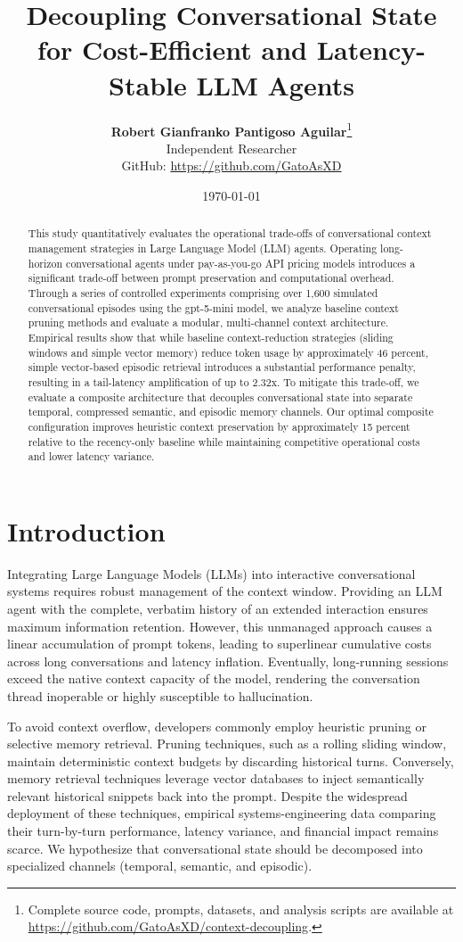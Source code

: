 \documentclass[11pt,journal,onecolumn]{article}
\title{\textbf{Decoupling Conversational State for Cost-Efficient and Latency-Stable LLM Agents}}
\author{\textbf{Robert Gianfranko Pantigoso Aguilar}\thanks{Complete source code, prompts, datasets, and analysis scripts are available at \url{https://github.com/GatoAsXD/context-decoupling}.} \\
Independent Researcher \\
GitHub: \url{https://github.com/GatoAsXD}}
\date{\today}
\begin{document}
\maketitle

\begin{abstract}
This study quantitatively evaluates the operational trade-offs of conversational context management strategies in Large Language Model (LLM) agents. Operating long-horizon conversational agents under pay-as-you-go API pricing models introduces a significant trade-off between prompt preservation and computational overhead. Through a series of controlled experiments comprising over 1,600 simulated conversational episodes using the gpt-5-mini model, we analyze baseline context pruning methods and evaluate a modular, multi-channel context architecture. Empirical results show that while baseline context-reduction strategies (sliding windows and simple vector memory) reduce token usage by approximately 46 percent, simple vector-based episodic retrieval introduces a substantial performance penalty, resulting in a tail-latency amplification of up to 2.32x. To mitigate this trade-off, we evaluate a composite architecture that decouples conversational state into separate temporal, compressed semantic, and episodic memory channels. Our optimal composite configuration improves heuristic context preservation by approximately 15 percent relative to the recency-only baseline while maintaining competitive operational costs and lower latency variance.
\end{abstract}

\section{Introduction}
Integrating Large Language Models (LLMs) into interactive conversational systems requires robust management of the context window. Providing an LLM agent with the complete, verbatim history of an extended interaction ensures maximum information retention. However, this unmanaged approach causes a linear accumulation of prompt tokens, leading to superlinear cumulative costs across long conversations and latency inflation. Eventually, long-running sessions exceed the native context capacity of the model, rendering the conversation thread inoperable or highly susceptible to hallucination.

To avoid context overflow, developers commonly employ heuristic pruning or selective memory retrieval. Pruning techniques, such as a rolling sliding window, maintain deterministic context budgets by discarding historical turns. Conversely, memory retrieval techniques leverage vector databases to inject semantically relevant historical snippets back into the prompt. Despite the widespread deployment of these techniques, empirical systems-engineering data comparing their turn-by-turn performance, latency variance, and financial impact remains scarce. We hypothesize that conversational state should be decomposed into specialized channels (temporal, semantic, and episodic).
\end{document}
